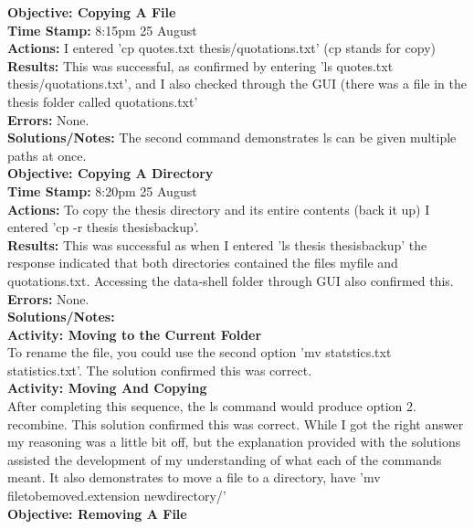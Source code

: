 \documentclass{article}
\begin{document}
\begin{FlushLeft}
\vspace{5mm}
\textbf{Objective: Copying A File}\\ 
\textbf{Time Stamp:} 8:15pm 25 August\\
\textbf{Actions:} I entered 'cp quotes.txt thesis/quotations.txt' (cp stands for copy)\\
\textbf{Results:} This was successful, as confirmed by entering 'ls quotes.txt thesis/quotations.txt', and I also checked through the GUI (there was a file in the thesis folder called quotations.txt'\\
\textbf{Errors:} None.\\
\textbf{Solutions/Notes:} The second command demonstrates ls can be given multiple paths at once.\\
\vspace{5mm}
\textbf{Objective: Copying A Directory}\\ 
\textbf{Time Stamp:} 8:20pm 25 August\\
\textbf{Actions:} To copy the thesis directory and its entire contents (back it up) I entered 'cp -r thesis thesis\textunderscore backup'. \\
\textbf{Results:} This was successful as when I entered 'ls thesis thesis\textunderscore backup' the response indicated that both directories contained the files my\textunderscore file and quotations.txt. Accessing the data-shell folder through GUI also confirmed this. \\
\textbf{Errors:} None.\\
\textbf{Solutions/Notes:}\\
\vspace{5mm}
\textbf{Activity: Moving to the Current Folder}\\ 
To rename the file, you could use the second option 'mv statstics.txt statistics.txt'. The solution confirmed this was correct.\\
\vspace{5mm}
\textbf{Activity: Moving And Copying}\\ 
After completing this sequence, the ls command would produce option 2. recombine. This solution confirmed this was correct. While I got the right answer my reasoning was a little bit off, but the explanation provided with the solutions assisted the development of my understanding of what each of the commands meant. It also demonstrates to move a file to a directory, have 'mv filetobemoved.extension newdirectory/'\\
\vspace{5mm}
\textbf{Objective: Removing A File}\\ 

\end{FlushLeft}
\end{document}
